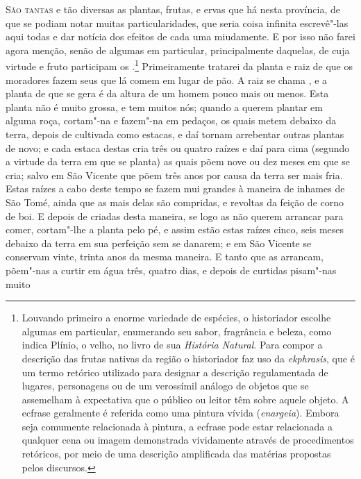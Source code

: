 \noindent\textsc{São tantas} e tão diversas as plantas, frutas, e ervas que há nesta
província, de que se podiam notar muitas particularidades, que seria
coisa infinita escrevê"-las aqui todas e dar notícia dos efeitos de cada
uma miudamente. E por isso não farei agora menção, senão de algumas em
particular, principalmente daquelas, de cuja virtude e fruto
participam os .\footnote{ Louvando primeiro a enorme
variedade de espécies, o historiador escolhe algumas em particular, 
enumerando seu sabor, fragrância e beleza, como indica Plínio, o
velho, no livro  de sua \textit{História Natural}. 
Para compor a descrição das frutas nativas da região o historiador faz uso da
\textit{ekphrasis}, que é um termo retórico utilizado para designar a
descrição regulamentada de lugares, personagens ou de um verossímil
análogo de objetos que se assemelham à expectativa que o público ou
leitor têm sobre aquele objeto. A ecfrase geralmente é referida como
uma pintura vívida (\textit{enargeia}). Embora seja comumente
relacionada à pintura, a ecfrase pode estar relacionada a
qualquer cena ou imagem demonstrada vividamente através de
procedimentos retóricos, por meio de uma descrição amplificada das
matérias propostas pelos discursos.} Primeiramente tratarei da planta e
raiz de que os moradores fazem seus  que lá comem em lugar
de pão. A raiz se chama , 
e a planta de que se gera é da altura de um homem pouco mais ou menos. 
Esta planta não é muito grossa,
e tem muitos nós; quando a querem plantar em alguma roça, cortam"-na e			%
fazem"-na em pedaços, os quais metem debaixo da terra, depois de
cultivada como estacas, e daí tornam arrebentar outras plantas de novo;
e cada estaca destas cria três ou quatro raízes e daí para cima
(segundo a virtude da terra em que se planta) as quais põem nove ou dez
meses em que se cria; salvo em São Vicente que põem três anos por causa			%
da terra ser mais fria. Estas raízes a cabo deste tempo se fazem mui
grandes à maneira de inhames de São Tomé, ainda que as mais delas são			%
compridas, e revoltas da feição de corno de boi. E depois de criadas
desta maneira, se logo as não querem arrancar para comer, cortam"-lhe a
planta pelo pé, e assim estão estas raízes cinco, seis meses debaixo da
terra em sua perfeição sem se danarem; e em São Vicente se conservam			%
vinte, trinta anos da mesma maneira. E tanto que as arrancam, põem"-nas
a curtir em água três, quatro dias, e depois de curtidas pisam"-nas muito
